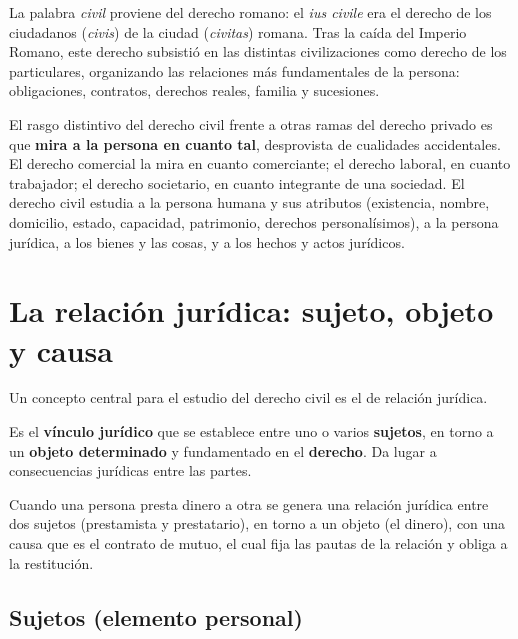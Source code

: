 \documentclass[12pt,oneside]{book}
\begin{document}
La palabra \textit{civil} proviene del derecho romano: el \textit{ius civile} era el derecho de los ciudadanos (\textit{civis}) de la ciudad (\textit{civitas}) romana. Tras la caída del Imperio Romano, este derecho subsistió en las distintas civilizaciones como derecho de los particulares, organizando las relaciones más fundamentales de la persona: obligaciones, contratos, derechos reales, familia y sucesiones.

\begin{importante}
El rasgo distintivo del derecho civil frente a otras ramas del derecho privado es que \textbf{mira a la persona en cuanto tal}, desprovista de cualidades accidentales. El derecho comercial la mira en cuanto comerciante; el derecho laboral, en cuanto trabajador; el derecho societario, en cuanto integrante de una sociedad. El derecho civil estudia a la persona humana y sus atributos (existencia, nombre, domicilio, estado, capacidad, patrimonio, derechos personalísimos), a la persona jurídica, a los bienes y las cosas, y a los hechos y actos jurídicos.
\end{importante}

\section{La relación jurídica: sujeto, objeto y causa}

Un concepto central para el estudio del derecho civil es el de relación jurídica.

\begin{definicion}
Es el \textbf{vínculo jurídico} que se establece entre uno o varios \textbf{sujetos}, en torno a un \textbf{objeto determinado} y fundamentado en el \textbf{derecho}. Da lugar a consecuencias jurídicas entre las partes.
\end{definicion}

\begin{ejemplo}
Cuando una persona presta dinero a otra se genera una relación jurídica entre dos sujetos (prestamista y prestatario), en torno a un objeto (el dinero), con una causa que es el contrato de mutuo, el cual fija las pautas de la relación y obliga a la restitución.
\end{ejemplo}

\subsection{Sujetos (elemento personal)}
\end{document}
